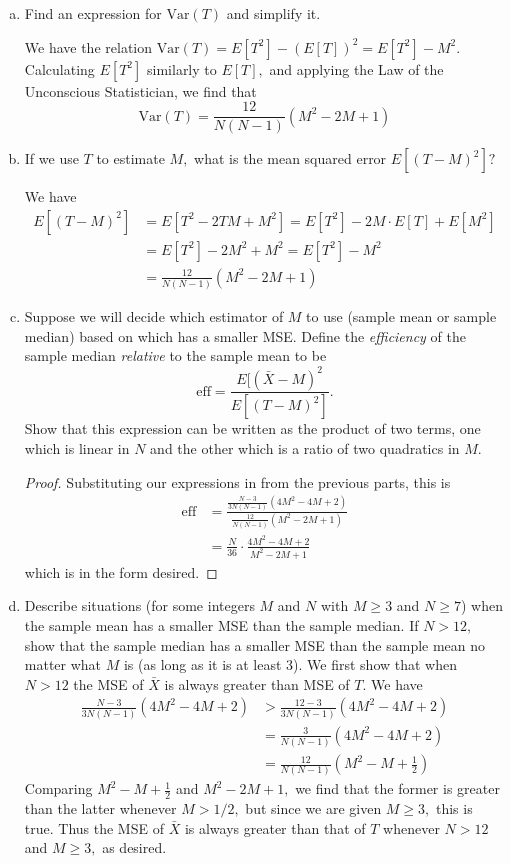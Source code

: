 \documentclass{article}
\newcommand{\var}{\mathrm{Var}}
\begin{document}
\begin{enumerate}
\begin{enumerate}[(a)]
			\item Find an expression for $\var(T)$ and simplify it.
				\begin{soln}
					We have the relation $\var(T)=E[T^2]-(E[T])^2=E[T^2]-M^2.$ Calculating $E[T^2]$ similarly to $E[T],$ and applying the Law of the Unconscious Statistician, we find that \[\var(T)=\boxed{\frac{12}{N(N-1)}(M^2-2M+1)}\]
				\end{soln}

			\item If we use $T$ to estimate $M,$ what is the mean squared error $E[(T-M)^2]?$
				\begin{soln}
					We have 
					\begin{align*}
						E[(T-M)^2]&=E[T^2-2TM+M^2]=E[T^2]-2M\cdot E[T]+E[M^2] \\
						&=E[T^2]-2M^2+M^2=E[T^2]-M^2 \\
						&= \boxed{\frac{12}{N(N-1)}(M^2-2M+1)}
					\end{align*}			
				\end{soln}

			\item Suppose we will decide which estimator of $M$ to use (sample mean or sample median) based on which has a smaller MSE. Define the \textit{efficiency} of the sample median \textit{relative} to the sample mean to be \[\text{eff}=\frac{E[(\bar{X}-M)^2}{E[(T-M)^2]}.\] Show that this expression can be written as the product of two terms, one which is linear in $N$ and the other which is a ratio of two quadratics in $M.$
				\begin{proof}
					Substituting our expressions in from the previous parts, this is
					\begin{align*}
						\text{eff} &= \frac{\frac{N-3}{3N(N-1)}(4M^2-4M+2)}{\frac{12}{N(N-1)}(M^2-2M+1)} \\
						&= \frac{N}{36} \cdot \frac{4M^2-4M+2}{M^2-2M+1}
					\end{align*} which is in the form desired.

				\end{proof}

			\item Describe situations (for some integers $M$ and $N$ with $M\ge3$ and $N\ge7$) when the sample mean has a smaller MSE than the sample median. If $N>12,$ show that the sample median has a smaller MSE than the sample mean no matter what $M$ is (as long as it is at least 3).
				We first show that when $N>12$ the MSE of $\bar{X}$ is always greater than MSE of $T.$ We have 
				\begin{align*}
					\frac{N-3}{3N(N-1)}(4M^2-4M+2) &> \frac{12-3}{3N(N-1)}(4M^2-4M+2) \\
					&= \frac{3}{N(N-1)}(4M^2-4M+2)\\
					&= \frac{12}{N(N-1)}\left( M^2-M+\frac{1}{2} \right)
				\end{align*} 
				Comparing $M^2-M+\frac{1}{2}$ and $M^2-2M+1,$ we find that the former is greater than the latter whenever $M>1/2,$ but since we are given $M\ge 3,$ this is true. Thus the MSE of $\bar{X}$ is always greater than that of $T$ whenever $N>12$ and $M\ge 3,$ as desired.


\end{enumerate}
\end{enumerate}
\end{document}
